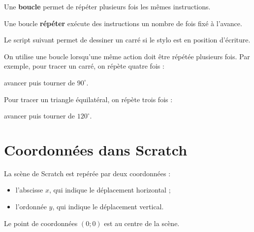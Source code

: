 \documentclass[a4paper,10pt]{report}
\begin{document}
\begin{defn}
Une \textbf{boucle} permet de répéter plusieurs fois les mêmes instructions.
\end{defn}

\begin{defn}
Une boucle \textbf{répéter} exécute des instructions un nombre de fois fixé à l'avance.
\end{defn}

\begin{exemple}
Le script suivant permet de dessiner un carré si le stylo est en position d'écriture.

\begin{center}
\begin{scratch}
{
}
\end{scratch}
\end{center}
\end{exemple}

\begin{meth}
On utilise une boucle lorsqu'une même action doit être répétée plusieurs fois. Par exemple, pour tracer un carré, on répète quatre fois :
\begin{center}
avancer puis tourner de $90^\circ$.
\end{center}
\end{meth}

\begin{exemple}
Pour tracer un triangle équilatéral, on répète trois fois :
\begin{center}
avancer puis tourner de $120^\circ$.
\end{center}
\end{exemple}

\section{Coordonnées dans Scratch}

\begin{defn}
La scène de Scratch est repérée par deux coordonnées :
\begin{itemize}
\item l'abscisse $x$, qui indique le déplacement horizontal ;
\item l'ordonnée $y$, qui indique le déplacement vertical.
\end{itemize}
Le point de coordonnées $(0;0)$ est au centre de la scène.
\end{defn}
\end{document}
